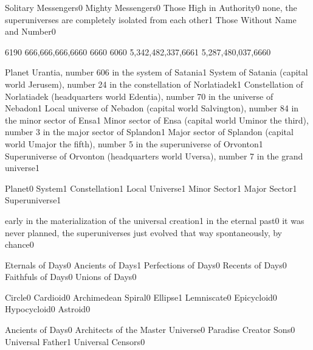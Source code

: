{Solitary Messengers}{0}
{Mighty Messengers}{0}
{Those High in Authority}{0}
{none, the superuniverses are completely isolated from each other}{1}
{Those Without Name and Number}{0}
\qstop

{619}{0}
{666,666,666,666}{0}
{666}{0}
{606}{0}
{5,342,482,337,666}{1}
{5,287,480,037,666}{0}
\qstop

{Planet Urantia, number 606 in the system of Satania}{1}
{System of Satania (capital world Jerusem), number 24 in the constellation of Norlatiadek}{1}
{Constellation of Norlatiadek (headquarters world Edentia), number 70 in the universe of Nebadon}{1}
{Local universe of Nebadon (capital world Salvington), number 84 in the minor sector of Ensa}{1}
{Minor sector of Ensa (capital world Uminor the third), number 3 in the major sector of Splandon}{1}
{Major sector of Splandon (capital world Umajor the fifth), number 5 in the superuniverse of Orvonton}{1}
{Superuniverse of Orvonton (headquarters world Uversa), number 7 in the grand universe}{1}
\qstop

{Planet}{0}
{System}{1}
{Constellation}{1}
{Local Universe}{1}
{Minor Sector}{1}
{Major Sector}{1}
{Superuniverse}{1}
\qstop

{early in the materialization of the universal creation}{1}
{in the eternal past}{0}
{it was never planned, the superuniverses just evolved that way spontaneously, by chance}{0}
\qstop

{Eternals of Days}{0}
{Ancients of Days}{1}
{Perfections of Days}{0}
{Recents of Days}{0}
{Faithfuls of Days}{0}
{Unions of Days}{0}
\qstop

{Circle}{0}
{Cardioid}{0}
{Archimedean Spiral}{0}
{Ellipse}{1}
{Lemniscate}{0}
{Epicycloid}{0}
{Hypocycloid}{0}
{Astroid}{0}
\qstop

{Ancients of Days}{0}
{Architects of the Master Universe}{0}
{Paradise Creator Sons}{0}
{Universal Father}{1}
{Universal Censors}{0}
\qstop

